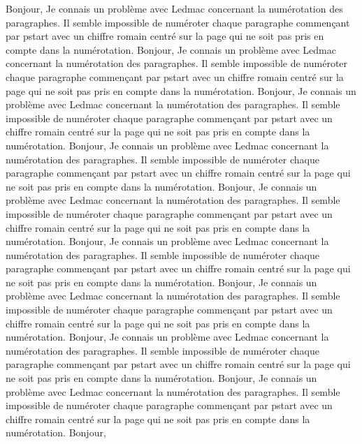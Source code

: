 \documentclass{article}
\begin{document}
\numberpstarttrue
\renewcommand{\thepstart}{\vspace{1cm}{\hfill \Roman{pstart}\hfill} \par\nopagebreak[4]}

\beginnumbering

\pstart Bonjour,
Je connais un problème avec Ledmac concernant la numérotation des paragraphes. Il semble impossible de numéroter chaque paragraphe commençant par pstart avec un chiffre romain centré sur la page qui ne soit pas pris en compte dans la numérotation. Bonjour,
Je connais un problème avec Ledmac concernant la numérotation des paragraphes. Il semble impossible de numéroter chaque paragraphe commençant par pstart avec un chiffre romain centré sur la page qui ne soit pas pris en compte dans la numérotation. Bonjour,
Je connais un problème avec Ledmac concernant la numérotation des paragraphes. Il semble impossible de numéroter chaque paragraphe commençant par pstart avec un chiffre romain centré sur la page qui ne soit pas pris en compte dans la numérotation. Bonjour,
Je connais un problème avec Ledmac concernant la numérotation des paragraphes. Il semble impossible de numéroter chaque paragraphe commençant par pstart avec un chiffre romain centré sur la page qui ne soit pas pris en compte dans la numérotation. Bonjour,
Je connais un problème avec Ledmac concernant la numérotation des paragraphes. Il semble impossible de numéroter chaque paragraphe commençant par pstart avec un chiffre romain centré sur la page qui ne soit pas pris en compte dans la numérotation. Bonjour,
Je connais un problème avec Ledmac concernant la numérotation des paragraphes. Il semble impossible de numéroter chaque paragraphe commençant par pstart avec un chiffre romain centré sur la page qui ne soit pas pris en compte dans la numérotation. Bonjour,
Je connais un problème avec Ledmac concernant la numérotation des paragraphes. Il semble impossible de numéroter chaque paragraphe commençant par pstart avec un chiffre romain centré sur la page qui ne soit pas pris en compte dans la numérotation. Bonjour,
Je connais un problème avec Ledmac concernant la numérotation des paragraphes. Il semble impossible de numéroter chaque paragraphe commençant par pstart avec un chiffre romain centré sur la page qui ne soit pas pris en compte dans la numérotation. Bonjour,
Je connais un problème avec Ledmac concernant la numérotation des paragraphes. Il semble impossible de numéroter chaque paragraphe commençant par pstart avec un chiffre romain centré sur la page qui ne soit pas pris en compte dans la numérotation. \pend
\pstart Bonjour,
\end{document}
